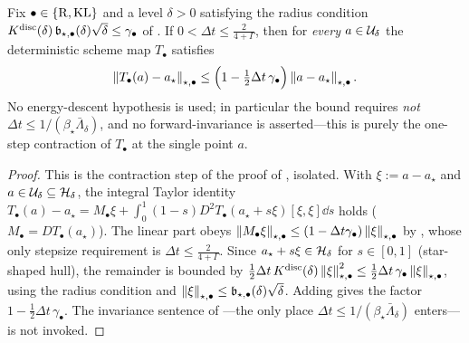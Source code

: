 \begin{lemma}
\label{lem:local-map-contraction}
Fix $\bullet\in\{\mathrm{R},\mathrm{KL}\}$ and a level $\delta>0$ satisfying the radius condition
$K^{\mathrm{disc}}(\delta)\,\mathfrak b_{\star,\bullet}(\delta)\sqrt\delta\leq\gamma_\bullet$ of .
If $0<\Delta t\leq\tfrac2{4+\Gamma}$, then for \emph{every} $a\in\mathcal{U}_\delta$ the deterministic scheme
map $T_\bullet$ satisfies
\[
    \left\lVert T_\bullet(a)-a_\star\right\rVert_{\star,\bullet}\leq\Bigl(1-\tfrac12\Delta t\,\gamma_\bullet\Bigr)\left\lVert a-a_\star\right\rVert_{\star,\bullet}.
\]
No energy-descent hypothesis is used; in particular the bound requires \emph{not}
$\Delta t\leq1/(\beta_\star\bar\Lambda_\delta)$, and no forward-invariance is asserted---this is purely
the one-step contraction of $T_\bullet$ at the single point $a$.
\end{lemma}

\begin{proof}
This is the contraction step of the proof of , isolated. With $\xi:=a-a_\star$ and
$a\in\mathcal{U}_\delta\subseteq\mathcal{H}_\delta$, the integral Taylor identity
$T_\bullet(a)-a_\star=M_\bullet\xi+\int_0^1(1-s)D^2T_\bullet(a_\star+s\xi)[\xi,\xi]\dd s$ holds
($M_\bullet=DT_\bullet(a_\star)$). The linear part obeys
$\left\lVert M_\bullet\xi\right\rVert_{\star,\bullet}\leq(1-\Delta t\gamma_\bullet)\left\lVert \xi\right\rVert_{\star,\bullet}$ by
, whose only stepsize requirement is $\Delta t\leq\tfrac2{4+\Gamma}$. Since
$a_\star+s\xi\in\mathcal{H}_\delta$ for $s\in[0,1]$ (star-shaped hull), the remainder is bounded by
$\tfrac12\Delta t\,K^{\mathrm{disc}}(\delta)\left\lVert \xi\right\rVert_{\star,\bullet}^2\leq\tfrac12\Delta t\,\gamma_\bullet\left\lVert \xi\right\rVert_{\star,\bullet}$,
using the radius condition and $\left\lVert \xi\right\rVert_{\star,\bullet}\leq\mathfrak b_{\star,\bullet}(\delta)\sqrt\delta$.
Adding gives the factor $1-\tfrac12\Delta t\,\gamma_\bullet$. The invariance sentence of
---the only place $\Delta t\leq1/(\beta_\star\bar\Lambda_\delta)$ enters---is not
invoked.
\end{proof}


